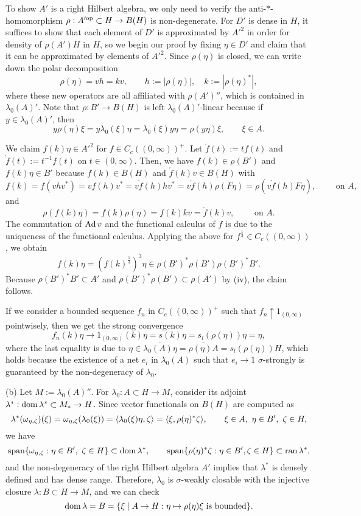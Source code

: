\documentclass{../../large}
\begin{document}
\begin{pf}
To show $A'$ is a right Hilbert algebra, we only need to verify the anti-$*$-homomorphism $\rho:A'^{\mathrm{op}}\subset H\to B(H)$ is non-degenerate.
For $D'$ is dense in $H$, it suffices to show that each element of $D'$ is approximated by $A'^2$ in order for density of $\rho(A')H$ in $H$, so we begin our proof by fixing $\eta\in D'$ and claim that it can be approximated by elements of $A'^2$.
Since $\rho(\eta)$ is closed, we can write down the polar decomposition
\[\rho(\eta)=vh=kv,\qquad h:=|\rho(\eta)|,\quad k:=|\rho(\eta)^*|,\]
where these new operators are all affiliated with $\rho(A')''$, which is contained in $\lambda_0(A)'$.
Note that $\rho:B'\to B(H)$ is left $\lambda_0(A)'$-linear because if $y\in\lambda_0(A)'$, then
\[y\rho(\eta)\xi=y\lambda_0(\xi)\eta=\lambda_0(\xi)y\eta=\rho(y\eta)\xi,\qquad\xi\in A.\]

We claim $f(k)\eta\in A'^2$ for $f\in C_c((0,\infty))^+$.
Let $\acute f(t):=tf(t)$ and $\grave f(t):=t^{-1}f(t)$ on $t\in(0,\infty)$.
Then, we have $f(k)\in\rho(B')$ and $f(k)\eta\in B'$ because $f(k)\in B(H)$ and $\acute f(k)v\in B(H)$ with
\[f(k)=f(vhv^*)=vf(h)v^*=v\grave f(h)hv^*=v\grave f(h)\rho(F\eta)=\rho\left(v\grave f(h)F\eta\right),\qquad\text{ on }A,\]
and
\[\rho(f(k)\eta)=f(k)\rho(\eta)=f(k)kv=\acute f(k)v,\qquad\text{ on }A.\]
The commutation of $\operatorname{Ad} v$ and the functional calculus of $f$ is due to the uniqueness of the functional calculus.
Applying the above for $f^{\frac13}\in C_c((0,\infty))$, we obtain
\[f(k)\eta=(f(k)^{\frac13})^3\eta\in\rho(B')^*\rho(B')\rho(B')^*B'.\]
Because $\rho(B')^*B'\subset A'$ and $\rho(B')^*\rho(B')\subset\rho(A')$ by (iv), the claim follows.

If we consider a bounded sequence $f_n$ in $C_c((0,\infty))^+$ such that $f_n\uparrow1_{(0,\infty)}$ pointwisely, then we get the strong convergence
\[f_n(k)\eta\to1_{(0,\infty)}(k)\eta=s(k)\eta=s_l(\rho(\eta))\eta=\eta,\]
where the last equality is due to $\eta\in\bar{\lambda_0(A)\eta}=\bar{\rho(\eta)A}=s_l(\rho(\eta))H$, which holds because the existence of a net $e_i$ in $\lambda_0(A)$ such that $e_i\to1$ $\sigma$-strongly is guaranteed by the non-degeneracy of $\lambda_0$.



(b)
Let $M:=\lambda_0(A)''$.
For $\lambda_0:A\subset H\to M$, consider its adjoint $\lambda^*:\operatorname{dom}\lambda^*\subset M_*\to H$.
Since vector functionals on $B(H)$ are computed as
\[\lambda^*(\omega_{\eta,\zeta})(\xi)=\omega_{\eta,\zeta}(\lambda_0(\xi))=\langle\lambda_0(\xi)\eta,\zeta\rangle=\langle\xi,\rho(\eta)^*\zeta\rangle,\qquad\xi\in A,\ \eta\in B',\ \zeta\in H,\]
we have
\[\operatorname{span}\{\omega_{\eta,\zeta}:\eta\in B',\ \zeta\in H\}\subset\operatorname{dom}\lambda^*,\qquad\operatorname{span}\{\rho(\eta)^*\zeta:\eta\in B',\zeta\in H\}\subset\operatorname{ran} \lambda^*,\]
and the non-degeneracy of the right Hilbert algebra $A'$ implies that $\lambda^*$ is densely defined and has dense range.
Therefore, $\lambda_0$ is $\sigma$-weakly closable with the injective closure $\lambda:B\subset H\to M$, and we can check
\[\operatorname{dom}\lambda=B=\{\xi\mid A\to H:\eta\mapsto\rho(\eta)\xi\text{ is bounded}\}.\]




\end{pf}
\end{document}
